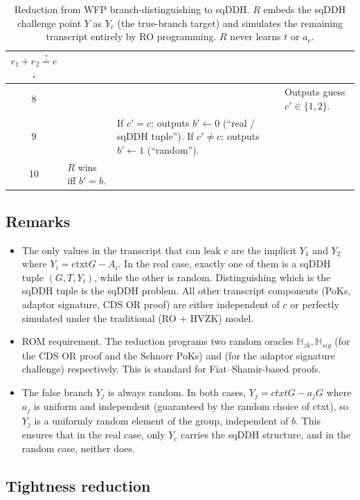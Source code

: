 \documentclass[11pt]{article}
\begin{document}
\begin{table}[h]
\begin{tabular}{|c|p{3.4cm}|p{6.3cm}|p{3.0cm}|}
$e_{1}+e_{2}\stackrel{?}{=}e$. \\
\hline
8 & & &
Outputs guess $c'\in\{1,2\}$. \\
\hline
9 & &
If $c'=c$: outputs $b'\leftarrow 0$ (``real / sqDDH tuple'').
If $c'\neq c$: outputs $b'\leftarrow 1$ (``random''). & \\
\hline
10 &
$R$ wins iff $b'=b$. & & \\
\hline
\end{tabular}
\caption{Reduction from WFP branch-distinguishing to sqDDH.
$R$ embeds the sqDDH challenge point $Y$ as $Y_{c}$ (the true-branch target)
and simulates the remaining transcript entirely by RO programming.
$R$ never learns $t$ or $a_{c}$.}
\label{tab:sqddh-reduction}
\end{table}

\subsection{Remarks}

\begin{itemize}
\item The only values in the transcript that can leak $c$ are the implicit $Y_1$ and $Y_2$ where $Y_i = \textrm{ctxt}G - A_i$. In the real case, exactly one of them is a sqDDH tuple $(G, T, Y_i)$, while the other is random. Distinguishing which is the sqDDH tuple is the sqDDH problem. All other transcript components (PoKs, adaptor signature, CDS OR proof) are either independent of $c$ or perfectly simulated under the traditional (RO + HVZK) model.

\item ROM requirement. The reduction programs two random oracles $\mathbb{H}_{zk}, \mathbb{H}_{sig}$ (for the CDS OR proof and the Schnorr PoKs) and (for the adaptor signature challenge) respectively. This is standard for Fiat–Shamir-based proofs.

\item The false branch $Y_j$ is always random. In both cases, $Y_j = ctxt G - a_j G$ where $a_j$ is uniform and independent (guaranteed by the random choice of ctxt), so $Y_j$ is a uniformly random element of the group, independent of $b$. This ensures that in the real case, only $Y_c$ carries the sqDDH structure, and in the random case, neither does.
\end{itemize}

\subsection{Tightness reduction}
\end{document}
